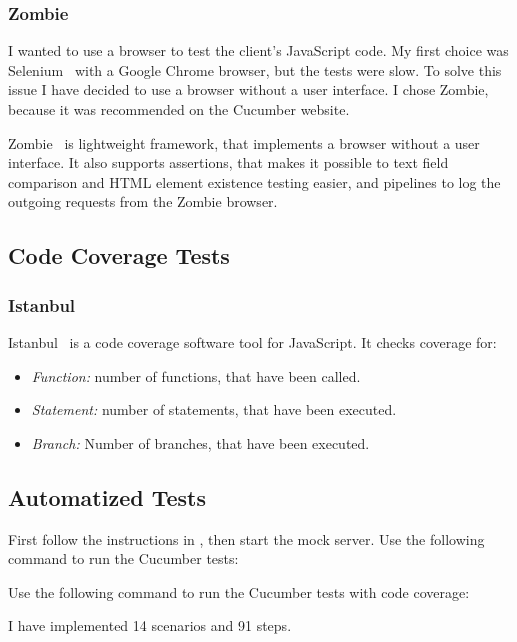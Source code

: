 \subsubsection{Zombie}
I wanted to use a browser to test the client's JavaScript code. My first choice was Selenium~\cite{selenium} with a Google Chrome browser, but the tests were slow. To solve this issue I have decided to use a browser without a user interface. I chose Zombie, because it was recommended on the Cucumber website.

Zombie~\cite{zombie} is lightweight framework, that implements a browser without a user interface. It also supports assertions, that makes it possible to text field comparison and HTML element existence testing easier, and pipelines to log the outgoing requests from the Zombie browser. 

\subsection{Code Coverage Tests}

\subsubsection{Istanbul}
Istanbul~\cite{istanbul} is a code coverage software tool for JavaScript. It checks coverage for:

\begin{itemize}
	\item \emph{Function:} number of functions, that have been called.
	\item \emph{Statement:} number of statements, that have been executed.
	\item \emph{Branch:} Number of branches, that have been executed.
\end{itemize}

\subsection{Automatized Tests}
First follow the instructions in , then start the mock server. Use the following command to run the Cucumber tests:


Use the following command to run the Cucumber tests with code coverage:


I have implemented 14 scenarios and 91 steps.

